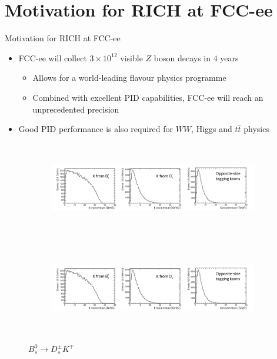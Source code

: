 \documentclass{beamer}
\begin{document}
\section{Motivation for RICH at FCC-ee}
\begin{frame}{Motivation for RICH at FCC-ee}
  \begin{itemize}
    \setlength\itemsep{1.0em}
    \item{FCC-ee will collect $3\times 10^{12}$ visible $Z$ boson decays in $4$ years}
    \begin{itemize}
      \item{Allows for a world-leading flavour physics programme}
      \item{Combined with excellent PID capabilities, FCC-ee will reach an unprecedented precision}
    \end{itemize}
    \item{Good PID performance is also required for $WW$, Higgs and $t\bar{t}$ physics}
  \end{itemize}
  \begin{figure}
    \centering
    \vspace{-0.2cm}
    \begin{subfigure}{0.5\textwidth}
      \includegraphics[height = 4cm, trim = {0 0 22.5cm 0}, clip = true]{Plots/p_spectrum_crop.png}
    \end{subfigure}%
    \begin{subfigure}{0.5\textwidth}
      \includegraphics[height = 4cm, trim = {22.0cm 0 0 0}, clip = true]{Plots/p_spectrum_crop.png}
    \end{subfigure}
    \caption{$B_s^0\to D_s^\pm K^\mp$}
  \end{figure}
\end{frame}
\end{document}
